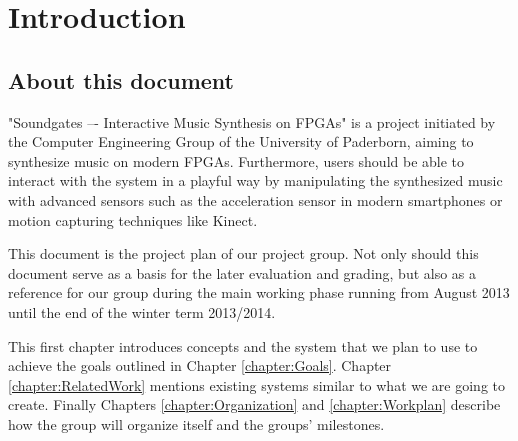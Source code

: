\chapter{Introduction}
	\label{chapter:Introduction}
	\section{About this document}
	
"Soundgates –- Interactive Music Synthesis on \ac{FPGA}s" is a project initiated by the Computer Engineering Group of the University of Paderborn, aiming to synthesize music on modern \ac{FPGA}s. 
Furthermore, users should be able to interact with the system in a playful way by manipulating the synthesized music with advanced sensors such as the acceleration sensor in modern smartphones or motion capturing techniques like Kinect.


This document is the project plan of our project group.
Not only should this document serve as a basis for the later evaluation and grading, 
but also as a reference for our group during the main working phase running from August 2013 until the end of the winter term 2013/2014. %

This first chapter introduces concepts and the system that we plan to use to achieve the goals outlined in Chapter \ref{chapter:Goals}. 
Chapter \ref{chapter:RelatedWork} mentions existing systems similar to what we are going to create.
Finally Chapters \ref{chapter:Organization} and \ref{chapter:Workplan} describe how the group will organize itself and the groups' milestones.

	 
